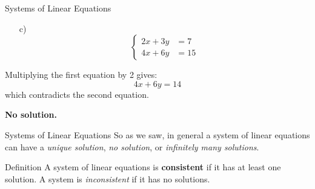 \documentclass{beamer}
\begin{document}
\begin{frame}{Systems of Linear Equations}
    \begin{itemize}
  \item[c)]     \[
  \begin{cases}
    2x + 3y &= 7 \\
    4x + 6y &= 15
  \end{cases}
  \]  
  \end{itemize}
  
  
  Multiplying the first equation by 2 gives:
  \[
  4x + 6y = 14
  \]
  which contradicts the second equation.
  \pause
  
  \textbf{No solution.}
\end{frame}




\begin{frame}{Systems of Linear Equations}
    So as we saw, in general a system of linear equations can have a \textit{unique solution}, \textit{no solution}, or \textit{infinitely many solutions}.
  \begin{block}{Definition}
    A system of linear equations is \textbf{consistent} if it has at least one solution. A system is \textit{inconsistent} if it has no solutions.

  \end{block}
  
\end{frame}
\end{document}
